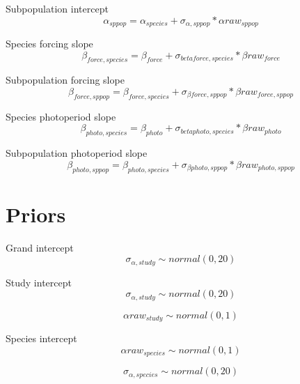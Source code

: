\documentclass[11pt,letter]{article}
\begin{document}
Subpopulation intercept 
\begin{equation}
\alpha_{sppop} = \alpha_{species}  + \sigma_{\alpha ,sppop} * \alpha raw_{sppop}
\end{equation}

Species forcing slope 
\begin{equation}
\beta _{force,species} = \beta_{force} + \sigma_{beta force, species} * \beta raw_{force}
\end{equation}

Subpopulation forcing slope 
\begin{equation}
\beta _{force,sppop} = \beta _{force,species} + \sigma_{\beta force,sppop} * \beta raw_{force,sppop}
\end{equation}

Species photoperiod slope 
\begin{equation}
\beta_{photo,species}  = \beta_{photo} + \sigma_{beta photo, species} * \beta raw_{photo}
\end{equation}

Subpopulation photoperiod slope 
\begin{equation}
\beta _{photo,sppop} = \beta_{photo, species} + \sigma_{\beta photo,sppop} * \beta raw_{photo, sppop}
\end{equation}



\section{Priors}

Grand intercept 
\begin{equation}
\sigma_{\alpha, study} \sim normal(0,20)
\end{equation}

Study intercept 
\begin{equation}
\sigma_{\alpha, study} \sim normal(0,20)
\end{equation}

\begin{equation}
\alpha raw _{study} \sim normal(0,1)
\end{equation}


Species intercept
\begin{equation}
\alpha raw _{species}\sim normal(0,1)
\end{equation}

\begin{equation}
\sigma_{\alpha, species} \sim normal(0,20)
\end{equation}
\end{document}
